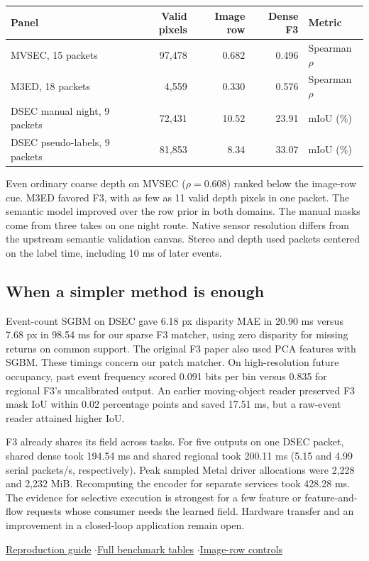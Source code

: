 \documentclass[11pt,letterpaper]{article}
\newcommand{\repo}{https://github.com/RobertAris/f3-regional-inference}
\begin{document}
\begin{center}\small\begin{tabular}{@{}lrrrl@{}}\toprule
Panel & Valid pixels & Image row & Dense F3 & Metric\\\midrule
MVSEC, 15 packets & 97,478 & 0.682 & 0.496 & Spearman $\rho$\\
M3ED, 18 packets & 4,559 & 0.330 & 0.576 & Spearman $\rho$\\
DSEC manual night, 9 packets & 72,431 & 10.52 & 23.91 & mIoU (\%)\\
DSEC pseudo-labels, 9 packets & 81,853 & 8.34 & 33.07 & mIoU (\%)\\\bottomrule
\end{tabular}\end{center}
Even ordinary coarse depth on MVSEC ($\rho=0.608$) ranked below the image-row cue. M3ED favored F3, with as few as 11 valid depth pixels in one packet. The semantic model improved over the row prior in both domains. The manual masks come from three takes on one night route. Native sensor resolution differs from the upstream semantic validation canvas. Stereo and depth used packets centered on the label time, including 10 ms of later events.

\subsection{When a simpler method is enough}
Event-count SGBM on DSEC gave 6.18 px disparity MAE in 20.90 ms versus 7.68 px in 98.54 ms for our sparse F3 matcher, using zero disparity for missing returns on common support. The original F3 paper also used PCA features with SGBM. These timings concern our patch matcher. On high-resolution future occupancy, past event frequency scored 0.091 bits per bin versus 0.835 for regional F3's uncalibrated output. An earlier moving-object reader preserved F3 mask IoU within 0.02 percentage points and saved 17.51 ms, but a raw-event reader attained higher IoU.

F3 already shares its field across tasks. For five outputs on one DSEC packet, shared dense took 194.54 ms and shared regional took 200.11 ms (5.15 and 4.99 serial packets/s, respectively). Peak sampled Metal driver allocations were 2,228 and 2,232 MiB. Recomputing the encoder for separate services took 428.28 ms. The evidence for selective execution is strongest for a few feature or feature-and-flow requests whose consumer needs the learned field. Hardware transfer and an improvement in a closed-loop application remain open.

\vfill\small\href{\repo/blob/main/docs/reproduction.md}{Reproduction guide}
\enspace$\cdot$\enspace\href{\repo/blob/main/evidence/tables.md}{Full benchmark tables}
\enspace$\cdot$\enspace\href{\repo/blob/main/evidence/spatial-controls.json}{Image-row controls}
\end{document}
